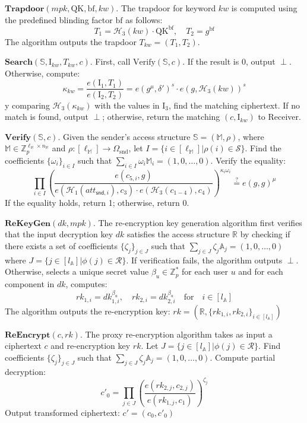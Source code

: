 \documentclass[runningheads]{llncs}
\begin{document}
$\mathbf{Trapdoor}(mpk, \text{QK}, \text{bf}, kw).$ The trapdoor for keyword $kw$ is computed using the predefined blinding factor $ \text{bf} $ as follows:
$$T_1 = \mathcal{H}_3(kw) \cdot \text{QK}^{\text{bf}}, \quad T_2 = g^{\text{bf}}$$
The algorithm outputs the trapdoor $ T_{kw} = (T_1, T_2) $.

$\mathbf{Search}(\mathbb{S}, \text{I}_{kw}, T_{kw}, c)$. First, call $ \text{Verify}(\mathbb{S}, c) $. If the result is 0, output $ \perp $. Otherwise, compute:
$$
\kappa_{kw} = \frac{e(\text{I}_1, T_1)}{e(\text{I}_2, T_2)} = e(g^\mu, \delta')^s \cdot e(g, \mathcal{H}_3(kw))^s
$$
y comparing $ \mathcal{H}_3(\kappa_{kw}) $ with the values in $ \text{I}_3 $, find the matching ciphertext. If no match is found, output $ \perp $; otherwise, return the matching $(c, \text{I}_{kw})$ to Receiver.

$\mathbf{Verify}(\mathbb{S}, c).$ Given the sender's access structure $ \mathbb{S} = (\mathbb{M}, \rho) $, where $ \mathbb{M} \in \mathbb{Z}_p^{\ell_\mathbb{M} \times n_\mathbb{M}} $ and $ \rho: [\ell_\mathbb{M}] \rightarrow \Omega_{\text{snd}} $, let $ I = \{ i \in [\ell_\mathbb{M}] | \rho(i) \in \mathcal{S} \} $. Find the coefficients $ \{ \omega_i \}_{i \in I} $ such that $ \sum_{i \in I} \omega_i \mathbb{M}_i = (1, 0, \ldots, 0) $. Verify the equality:
$$
\prod_{i \in I} \left( \frac{e(c_{5,i}, g)}{e(\mathcal{H}_1(att_{\mathsf{snd},i}), c_3) \cdot e(\mathcal{H}_3(c_{1-4}), c_4)} \right)^{\kappa_i \omega_i} \overset{?}{=} e(g, g)^\mu
$$
If the equality holds, return 1; otherwise, return 0.

$\mathbf{ReKeyGen}(dk, mpk)$. The re-encryption key generation algorithm first verifies that the input decryption key $dk$ satisfies the access structure $\mathbb{R}$ by checking if there exists a set of coefficients $\{\zeta_j\}_{j \in J}$ such that $\sum_{j \in J} \zeta_j \mathbb{A}_j = (1,0,\ldots,0)$ where $J = \{j \in [l_{\mathbb{A}}] | \phi(j) \in \mathcal{R}\}$. If verification fails, the algorithm outputs $\perp$. Otherwise, selects a unique secret value $\beta_u \in \mathbb{Z}_p^*$ for each user $u$ and for each component in $dk$, computes:
$$
rk_{1,i} = dk_{1,i}^{\beta_u},\quad rk_{2,i} = dk_{2,i}^{\beta_u} \quad \text{for} \quad i \in [l_\mathbb{A}]
$$
The algorithm outputs the re-encryption key: $rk = (\mathbb{R}, \{rk_{1,i}, rk_{2,i}\}_{i \in [l_\mathbb{A}]})$

$\mathbf{ReEncrypt}(c, rk)$. The proxy re-encryption algorithm takes as input a ciphertext $c$ and re-encryption key $rk$. Let $J = \{j \in [l_{\mathbb{A}}] | \phi(j) \in \mathcal{R}\}$. Find coefficients $\{\zeta_j\}_{j \in J}$ such that $\sum_{j \in J} \zeta_j \mathbb{A}_j = (1,0,\ldots,0)$. Compute partial decryption:
$$c'_0 = \prod_{j \in J} \left(\frac{e(rk_{2,j}, c_{2,j})}{e(rk_{1,j}, c_1)}\right)^{\zeta_j}$$
Output transformed ciphertext: $c' = (c_0, c'_0)$
\end{document}
